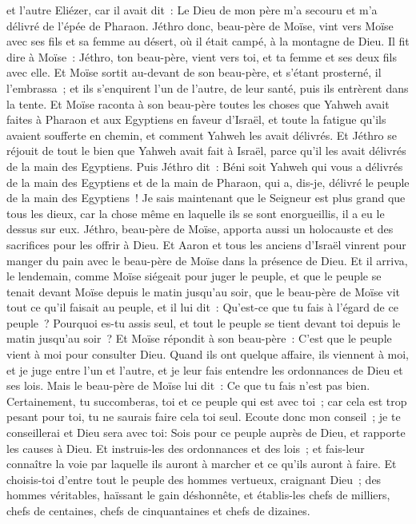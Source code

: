 \begin{multicols}{2}
et l'autre Eliézer, car il avait dit~: Le Dieu de mon père m'a secouru et m'a délivré de l'épée de Pharaon.
Jéthro donc, beau-père de Moïse, vint vers Moïse avec ses fils et sa femme au désert, où il était campé, à la montagne de Dieu.
Il fit dire à Moïse~: Jéthro, ton beau-père, vient vers toi, et ta femme et ses deux fils avec elle.
Et Moïse sortit au-devant de son beau-père, et s'étant prosterné, il l'embrassa~; et ils s'enquirent l'un de l'autre, de leur santé, puis ils entrèrent dans la tente.
Et Moïse raconta à son beau-père toutes les choses que Yahweh avait faites à Pharaon et aux Egyptiens en faveur d'Israël, et toute la fatigue qu'ils avaient soufferte en chemin, et comment Yahweh les avait délivrés.
Et Jéthro se réjouit de tout le bien que Yahweh avait fait à Israël, parce qu'il les avait délivrés de la main des Egyptiens.
Puis Jéthro dit~: Béni soit Yahweh qui vous a délivrés de la main des Egyptiens et de la main de Pharaon, qui a, dis-je, délivré le peuple de la main des Egyptiens~!
Je sais maintenant que le Seigneur est plus grand que tous les dieux, car la chose même en laquelle ils se sont enorgueillis, il a eu le dessus sur eux.
Jéthro, beau-père de Moïse, apporta aussi un holocauste et des sacrifices pour les offrir à Dieu. Et Aaron et tous les anciens d'Israël vinrent pour manger du pain avec le beau-père de Moïse dans la présence de Dieu.
Et il arriva, le lendemain, comme Moïse siégeait pour juger le peuple, et que le peuple se tenait devant Moïse depuis le matin jusqu'au soir,
que le beau-père de Moïse vit tout ce qu'il faisait au peuple, et il lui dit~: Qu'est-ce que tu fais à l'égard de ce peuple~? Pourquoi es-tu assis seul, et tout le peuple se tient devant toi depuis le matin jusqu'au soir~?
 Et Moïse répondit à son beau-père~: C'est que le peuple vient à moi pour consulter Dieu.
Quand ils ont quelque affaire, ils viennent à moi, et je juge entre l'un et l'autre, et je leur fais entendre les ordonnances de Dieu et ses lois.
Mais le beau-père de Moïse lui dit~: Ce que tu fais n'est pas bien.
Certainement, tu succomberas, toi et ce peuple qui est avec toi~; car cela est trop pesant pour toi, tu ne saurais faire cela toi seul.
Ecoute donc mon conseil~; je te conseillerai et Dieu sera avec toi: Sois pour ce peuple auprès de Dieu, et rapporte les causes à Dieu.
Et instruis-les des ordonnances et des lois~; et fais-leur connaître la voie par laquelle ils auront à marcher et ce qu'ils auront à faire.
Et choisis-toi d'entre tout le peuple des hommes vertueux, craignant Dieu~; des hommes véritables, haïssant le gain déshonnête, et établis-les chefs de milliers, chefs de centaines, chefs de cinquantaines et chefs de dizaines.

\end{multicols}
